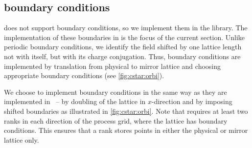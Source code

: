 \subsection{\CstarHeading boundary conditions}
\label{sec:interface:cstar}

\Quda does not support \Cstar boundary conditions, so we implement them in the \quda library.
The implementation of these boundaries in \quda is the focus of the current section.
Unlike periodic boundary conditions, we identify the field shifted by one lattice length not with itself, but with its charge conjugation.
Thus, \Cstar boundary conditions are implemented by translation from physical to mirror lattice and choosing appropriate boundary conditions (see \cref{fig:cstar:orbi}).

%   

We choose to implement \Cstar boundary conditions in the same way as they are implemented in \openqxd\ -- by doubling of the lattice in $x$-direction and by imposing shifted boundaries as illustrated in \cref{fig:cstar:orbi}. Note that \openqxd requires at least two ranks in each direction of the process grid, where the lattice has \Cstar boundary conditions. This ensures that a rank stores points in either the physical or mirror lattice only.

